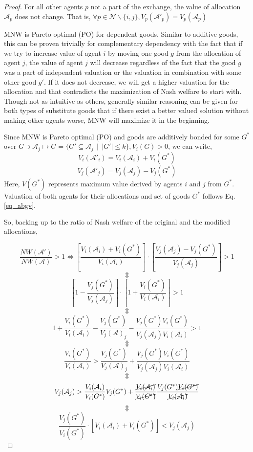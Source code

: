 \begin{proof}
For all other agents $p$ not a part of the exchange, the value of allocation $\mathcal{A}_p$ does not change. That is, $\forall p \in \mathcal{N}\backslash\{i,j\}, V_p(\mathcal{A}'_p) = V_p(\mathcal{A}_p)$

MNW is Pareto optimal (PO) for dependent goods. Similar to additive goods, this can be proven trivially for complementary dependency with the fact that if we try to increase value of agent $i$ by moving one good $g$ from the allocation of agent $j$, the value of agent $j$ will decrease regardless of the fact that the good $g$ was a part of independent valuation or the valuation in combination with some other good $g'$. If it does not decrease, we will get a higher valuation for the allocation and that contradicts the maximization of Nash welfare to start with. Though not as intuitive as others, generally similar reasoning can be given for both types of substitute goods that if there exist a better valued solution without making other agents worse, MNW will maximize it in the beginning.

Since MNW is Pareto optimal (PO) and goods are additively bonded for some $G^*$ over $G \ni \mathcal{A}_j \mapsto G = \{G' \subseteq \mathcal{A}_j \, \mid \, \lvert G'\rvert \leq k\}, V_i(G)>0$, we can write,
$$
    V_i(\mathcal{A}'_i) = V_i(\mathcal{A}_i) + V_i(G^*)
$$
$$
    V_j(\mathcal{A}'_j) = V_j(\mathcal{A}_j) - V_j(G^*)
$$
Here, $V(G^*)$ represents maximum value derived by agents $i$ and $j$ from $G^*$. Valuation of both agents for their allocations and set of goods $G^*$ follows Eq. \ref{eq_abgv}.

So, backing up to the ratio of Nash welfare of the original and the modified allocations,

$$
    \frac{NW(\mathcal{A}')}{NW(\mathcal{A})} > 1 \Leftrightarrow \left[ \frac{V_i(\mathcal{A}_i) + V_i(G^*)}{V_i(\mathcal{A}_i)} \right] \cdot \left[ \frac{V_j(\mathcal{A}_j) - V_j(G^*)}{V_j(\mathcal{A}_j)} \right] > 1
$$
$$\Updownarrow $$
$$
    \left[1 - \frac{V_j(G^*)}{V_j(\mathcal{A}_j)}\right] \cdot \left[1 + \frac{V_i(G^*)}{V_i(\mathcal{A}_i)}\right] > 1
$$
$$\Updownarrow $$
$$
    1 + \frac{V_i(G^*)}{V_i(\mathcal{A}_i)} - \frac{V_j(G^*)}{V_j(\mathcal{A})_j} - \frac{V_j(G^*) V_i(G^*)}{V_j(\mathcal{A}_j) V_i(\mathcal{A}_i)} > 1
$$
$$\Updownarrow $$
$$
    \frac{V_i(G^*)}{V_i(\mathcal{A}_i)} > \frac{V_j(G^*)}{V_j(\mathcal{A})_j} + \frac{V_j(G^*) V_i(G^*)}{V_j(\mathcal{A}_j) V_i(\mathcal{A}_i)}
$$
$$\Updownarrow $$
$$
    V_j(\mathcal{A}_j) > \frac{V_i(\mathcal{A}_i)}{V_i(G^*)} V_j(G^*) + \frac{\cancel{V_i(\mathcal{A}_i)}}{\cancel{V_i(G^*)}} \frac{V_j(G^*) \cancel{V_i(G^*)}}{\cancel{V_i(\mathcal{A}_i)}}
$$
$$\Updownarrow $$
\begin{equation}
\label{eq_prooffinal}
    \frac{V_j(G^*)}{V_i(G^*)} \cdot \left[V_i(\mathcal{A}_i) + V_i(G^*) \right] < V_j(\mathcal{A}_j)
\end{equation}


\end{proof}
